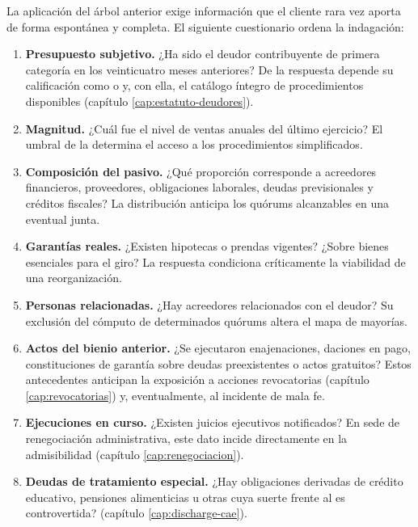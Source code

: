 La aplicación del árbol anterior exige información que el cliente rara vez aporta de
forma espontánea y completa. El siguiente cuestionario ordena la indagación:

\begin{enumerate}
  \item \textbf{Presupuesto subjetivo.} ¿Ha sido el deudor contribuyente de primera
  categoría en los veinticuatro meses anteriores? De la respuesta depende su calificación
  como \empresadeudora{} o \personadeudora{} y, con ella, el catálogo íntegro de
  procedimientos disponibles (capítulo \ref{cap:estatuto-deudores}).

  \item \textbf{Magnitud.} ¿Cuál fue el nivel de ventas anuales del último ejercicio?
  El umbral de la \Lpyme{} \citeyearpar{ley-20416} determina el acceso a los
  procedimientos simplificados.

  \item \textbf{Composición del pasivo.} ¿Qué proporción corresponde a acreedores
  financieros, proveedores, obligaciones laborales, deudas previsionales y créditos
  fiscales? La distribución anticipa los quórums alcanzables en una eventual junta.

  \item \textbf{Garantías reales.} ¿Existen hipotecas o prendas vigentes? ¿Sobre bienes
  esenciales para el giro? La respuesta condiciona críticamente la viabilidad de una
  reorganización.

  \item \textbf{Personas relacionadas.} ¿Hay acreedores relacionados con el deudor? Su
  exclusión del cómputo de determinados quórums altera el mapa de mayorías.

  \item \textbf{Actos del bienio anterior.} ¿Se ejecutaron enajenaciones, daciones en
  pago, constituciones de garantía sobre deudas preexistentes o actos gratuitos? Estos
  antecedentes anticipan la exposición a acciones revocatorias (capítulo
  \ref{cap:revocatorias}) y, eventualmente, al incidente de mala fe.

  \item \textbf{Ejecuciones en curso.} ¿Existen juicios ejecutivos notificados? En sede
  de renegociación administrativa, este dato incide directamente en la admisibilidad
  (capítulo \ref{cap:renegociacion}).

  \item \textbf{Deudas de tratamiento especial.} ¿Hay obligaciones derivadas de crédito
  educativo, pensiones alimenticias u otras cuya suerte frente al \discharge{} es
  controvertida? (capítulo \ref{cap:discharge-cae}).
\end{enumerate}

